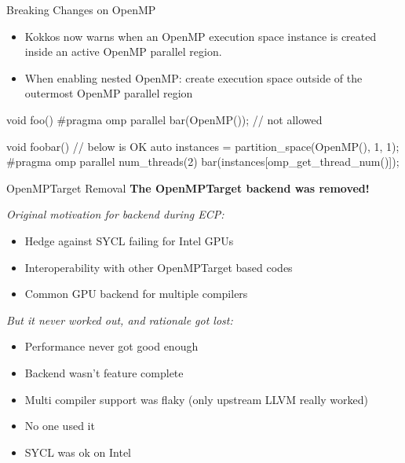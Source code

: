 \begin{frame}[fragile]{Breaking Changes on OpenMP}
 \begin{itemize}
   \item Kokkos now warns when an OpenMP execution space instance is created inside an active OpenMP parallel region.
   \item When enabling nested OpenMP: create execution space outside of the outermost OpenMP parallel region
 \end{itemize}
\begin{code}
void foo() {
  #pragma omp parallel
  {
    bar(OpenMP()); // not allowed
  }
}

void foobar() { // below is OK
  auto instances = partition_space(OpenMP(), 1, 1);
  #pragma omp parallel num_threads(2)
  {
    bar(instances[omp_get_thread_num()]);
  }
}
\end{code}
\end{frame}

\begin{frame}[fragile]{OpenMPTarget Removal}
\textbf{The OpenMPTarget backend was removed!}
\vspace{0.5cm}

  \textit{Original motivation for backend during ECP:}
  \begin{itemize}
     \item Hedge against SYCL failing for Intel GPUs
     \item Interoperability with other OpenMPTarget based codes
     \item Common GPU backend for multiple compilers
  \end{itemize}
\vspace{0.2cm}

  \textit{But it never worked out, and rationale got lost:}
  \begin{itemize}
     \item Performance never got good enough
     \item Backend wasn't feature complete
     \item Multi compiler support was flaky (only upstream LLVM really worked)
     \item No one used it
     \item SYCL was ok on Intel
  \end{itemize}
\end{frame}


